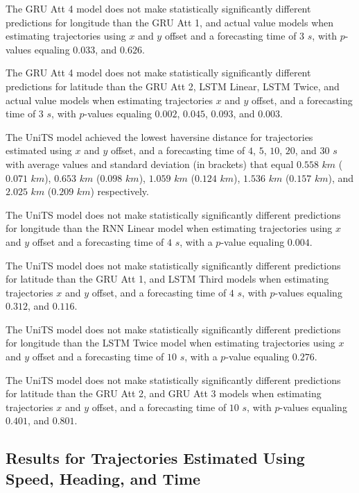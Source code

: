 The GRU Att 4 model does not make statistically significantly different predictions for longitude than the GRU Att 1, and actual value models when estimating trajectories using $x$ and $y$ offset and a forecasting time of $3$ $s$, with $p$-values equaling $0.033$, and $0.626$.

The GRU Att 4 model does not make statistically significantly different predictions for latitude than the GRU Att 2, LSTM Linear, LSTM Twice, and actual value models when estimating trajectories $x$ and $y$ offset, and a forecasting time of $3$ $s$, with $p$-values equaling $0.002$, $0.045$, $0.093$, and $0.003$.

The UniTS model achieved the lowest haversine distance for trajectories estimated using $x$ and $y$ offset, and a forecasting time of $4$, $5$, $10$, $20$, and $30$ $s$ with average values and standard deviation (in brackets) that equal $0.558$ $km$ ($0.071$ $km$), $0.653$ $km$ ($0.098$ $km$), $1.059$ $km$ ($0.124$ $km$), $1.536$ $km$ ($0.157$ $km$), and $2.025$ $km$ ($0.209$ $km$) respectively.

The UniTS model does not make statistically significantly different predictions for longitude than the RNN Linear model when estimating trajectories using $x$ and $y$ offset and a forecasting time of $4$ $s$, with a $p$-value equaling $0.004$.

The UniTS model does not make statistically significantly different predictions for latitude than the GRU Att 1, and LSTM Third models when estimating trajectories $x$ and $y$ offset, and a forecasting time of $4$ $s$, with $p$-values equaling $0.312$, and $0.116$.

The UniTS model does not make statistically significantly different predictions for longitude than the LSTM Twice model when estimating trajectories using $x$ and $y$ offset and a forecasting time of $10$ $s$, with a $p$-value equaling $0.276$.

The UniTS model does not make statistically significantly different predictions for latitude than the GRU Att 2, and GRU Att 3 models when estimating trajectories $x$ and $y$ offset, and a forecasting time of $10$ $s$, with $p$-values equaling $0.401$, and $0.801$.

\subsection{Results for Trajectories Estimated Using Speed, Heading, and Time}


